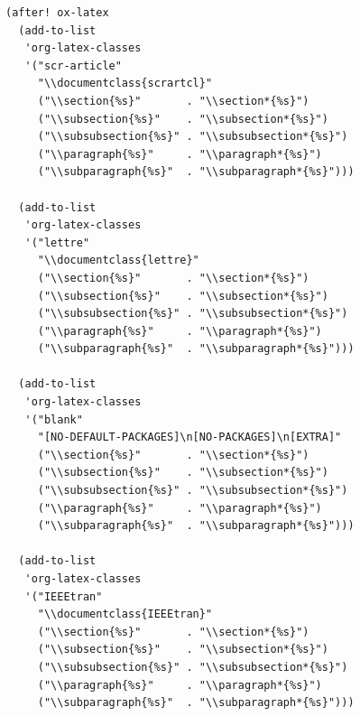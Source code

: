\documentclass[11pt]{article}
\begin{document}
\begin{verbatim}
(after! ox-latex
  (add-to-list
   'org-latex-classes
   '("scr-article"
     "\\documentclass{scrartcl}"
     ("\\section{%s}"       . "\\section*{%s}")
     ("\\subsection{%s}"    . "\\subsection*{%s}")
     ("\\subsubsection{%s}" . "\\subsubsection*{%s}")
     ("\\paragraph{%s}"     . "\\paragraph*{%s}")
     ("\\subparagraph{%s}"  . "\\subparagraph*{%s}")))

  (add-to-list
   'org-latex-classes
   '("lettre"
     "\\documentclass{lettre}"
     ("\\section{%s}"       . "\\section*{%s}")
     ("\\subsection{%s}"    . "\\subsection*{%s}")
     ("\\subsubsection{%s}" . "\\subsubsection*{%s}")
     ("\\paragraph{%s}"     . "\\paragraph*{%s}")
     ("\\subparagraph{%s}"  . "\\subparagraph*{%s}")))

  (add-to-list
   'org-latex-classes
   '("blank"
     "[NO-DEFAULT-PACKAGES]\n[NO-PACKAGES]\n[EXTRA]"
     ("\\section{%s}"       . "\\section*{%s}")
     ("\\subsection{%s}"    . "\\subsection*{%s}")
     ("\\subsubsection{%s}" . "\\subsubsection*{%s}")
     ("\\paragraph{%s}"     . "\\paragraph*{%s}")
     ("\\subparagraph{%s}"  . "\\subparagraph*{%s}")))

  (add-to-list
   'org-latex-classes
   '("IEEEtran"
     "\\documentclass{IEEEtran}"
     ("\\section{%s}"       . "\\section*{%s}")
     ("\\subsection{%s}"    . "\\subsection*{%s}")
     ("\\subsubsection{%s}" . "\\subsubsection*{%s}")
     ("\\paragraph{%s}"     . "\\paragraph*{%s}")
     ("\\subparagraph{%s}"  . "\\subparagraph*{%s}")))


\end{verbatim}
\end{document}
